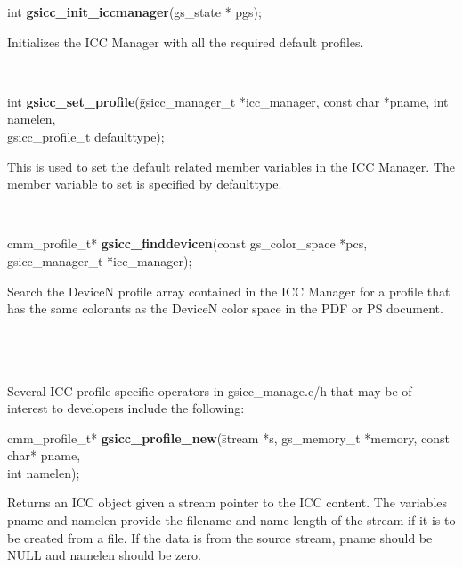 \documentclass[12pt,notitlepage]{article}
\begin{document}
\begin{tabbing}
\noindent int {\bf gsicc\_init\_iccmanager}(gs\_state * pgs);\\
\end{tabbing}

\begin{minipage}[h]{6.0in}
Initializes the ICC Manager with all the required default profiles.
\end{minipage}\\

\begin{tabbing}
\noindent int {\bf gsicc\_set\_profile}(\=gsicc\_manager\_t *icc\_manager, const char *pname, int namelen, \\
\>gsicc\_profile\_t defaulttype);\\
\end{tabbing}

\begin{minipage}[h]{6.0in}
This is used to set the default related member variables in the ICC Manager.  The member variable to set is specified by defaulttype.
\end{minipage}\\

\begin{tabbing}
\noindent cmm\_profile\_t* {\bf gsicc\_finddevicen}(const gs\_color\_space *pcs, gsicc\_manager\_t *icc\_manager);\\
\end{tabbing}

\begin{minipage}[h]{6.0in}
Search the DeviceN profile array contained in the ICC Manager for a profile that has the same colorants as the DeviceN color space in the PDF or PS document.
\end{minipage}\\ \\ \\


\noindent Several ICC profile-specific operators in gsicc\_manage.c/h that may be of interest to developers include the following:\\

\begin{tabbing}
\noindent cmm\_profile\_t* {\bf gsicc\_profile\_new}(\=stream *s, gs\_memory\_t *memory, const char* pname, \\
\>int namelen);\\
\end{tabbing}

\begin{minipage}[h]{6.0in}
Returns an ICC object given a stream pointer to the ICC content.  The variables pname and namelen provide the filename and name length of the stream if it is to be created from a file.  If the data is from the source stream, pname should be NULL and namelen should be zero.
\end{minipage}\\
\\
\end{document}
